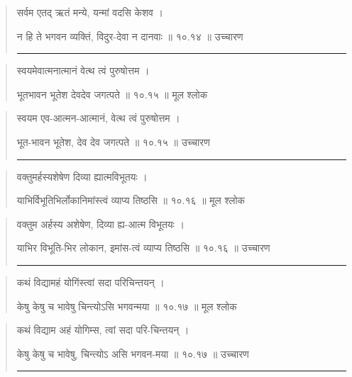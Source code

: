 \begin{quotation}

सर्वम एतद् ऋतं मन्ये, यन्मां वदसि केशव  ।  

न हि ते भगवन व्यक्तिं, विदुर-देवा न दानवाः  ॥ १०.१४ ॥  उच्चारण

\noindent\rule{16cm}{0.4pt} 
\end{quotation}


\begin{quotation} 

स्वयमेवात्मनात्मानं वेत्थ त्वं पुरुषोत्तम  ।  

भूतभावन भूतेश देवदेव जगत्पते  ॥ १०.१५ ॥  मूल श्लोक
\end{quotation}

\begin{quotation}

स्वयम एव-आत्मन-आत्मानं, वेत्थ त्वं पुरुषोत्तम  ।  

भूत-भावन भूतेश, देव देव जगत्पते  ॥ १०.१५ ॥  उच्चारण

\noindent\rule{16cm}{0.4pt} 
\end{quotation}


\begin{quotation} 

वक्तुमर्हस्यशेषेण दिव्या ह्यात्मविभूतयः  ।  

याभिर्विभूतिभिर्लोकानिमांस्त्वं व्याप्य तिष्ठसि  ॥ १०.१६ ॥  मूल श्लोक
\end{quotation}

\begin{quotation}

वक्तुम अर्हस्य अशेषेण, दिव्या ह्य-आत्म विभूतयः  ।  

याभिर विभूति-भिर लोकान, इमांस-त्वं व्याप्य तिष्ठसि  ॥ १०.१६ ॥  उच्चारण

\noindent\rule{16cm}{0.4pt} 
\end{quotation}


\begin{quotation} 
कथं विद्यामहं योगिंस्त्वां सदा परिचिन्तयन्‌  ।  

केषु केषु च भावेषु चिन्त्योऽसि भगवन्मया  ॥ १०.१७ ॥  मूल श्लोक
\end{quotation}

\begin{quotation}

कथं विद्याम अहं योगिम्स, त्वां सदा परि-चिन्तयन्‌  ।  

केषु केषु च भावेषु, चिन्त्योऽ असि भगवन-मया  ॥ १०.१७ ॥  उच्चारण

\noindent\rule{16cm}{0.4pt} 
\end{quotation}


